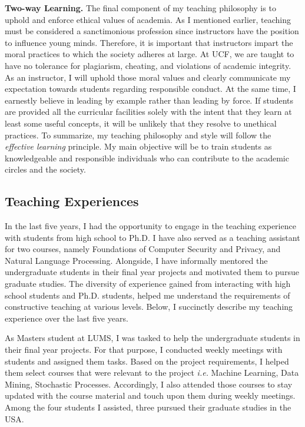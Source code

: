 \documentclass{NSF}
\newcommand{\BfPara}[1]{{\noindent\textbf{#1.}}\xspace}
\newcommand{\ie}{{\em i.e.}\xspace}
\begin{document}
\BfPara{Two-way Learning} The final component of my teaching philosophy is to uphold and enforce ethical values of academia. As I mentioned earlier, teaching must be considered a sanctimonious profession since instructors have the position to influence young minds. Therefore, it is important that instructors impart the moral practices to which the society adheres at large. At UCF, we are taught to have no tolerance for plagiarism, cheating, and violations of academic integrity. As an instructor, I will uphold those moral values and clearly communicate my expectation towards students regarding responsible conduct. At the same time, I earnestly believe in leading by example rather than leading by force. If students are provided all the curricular facilities solely with the intent that they learn at least some useful concepts, it will be unlikely that they resolve to unethical practices. To summarize, my teaching philosophy and style will follow the {\em effective learning} principle. My main objective will be to train students as knowledgeable and responsible individuals who can contribute to the academic circles and the society. 




\subsection*{Teaching Experiences}
In the last five years, I had the opportunity to engage in the teaching experience with students from high school to Ph.D. I have also served as a teaching assistant for two courses, namely Foundations of Computer Security and Privacy, and Natural Language Processing. Alongside, I have informally mentored the undergraduate students in their final year projects and motivated them to pursue graduate studies. The diversity of experience gained from interacting with high school students and Ph.D. students, helped me understand the requirements of constructive teaching at various levels. Below, I succinctly describe my teaching experience over the last five years.

As Masters student at LUMS, I was tasked to help the undergraduate students in their final year projects. For that purpose, I conducted weekly meetings with students and assigned them tasks. Based on the project requirements, I helped them select courses that were relevant to the project \ie Machine Learning, Data Mining, Stochastic Processes. Accordingly, I also attended those courses to stay updated with the course material and touch upon them during weekly meetings. Among the four students I assisted, three pursued their graduate studies in the USA.
\end{document}
